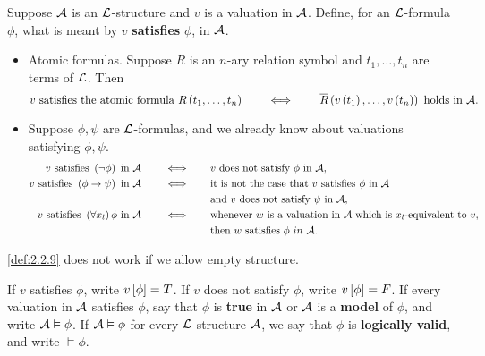 \begin{definition}
\label{def:2.2.9}
Suppose $ \AA $ is an $ \LL $-structure and $ v $ is a valuation in $ \AA $. Define, for an $ \LL $-formula $ \phi $, what is meant by $ v $ \textbf{satisfies} $ \phi $, in $ \AA $.
\begin{itemize}
\item Atomic formulas. Suppose $ R $ is an $ n $-ary relation symbol and $ t_1, \dots, t_n $ are terms of $ \LL $. Then
$$ v \ \text{satisfies the atomic formula} \ R\rb{t_1, \dots, t_n} \qquad \iff \qquad \overline{R}\rb{v\rb{t_1}, \dots, v\rb{t_n}} \ \text{holds in} \ \AA. $$
\item Suppose $ \phi, \psi $ are $ \LL $-formulas, and we already know about valuations satisfying $ \phi, \psi $.
\begin{align*}
v \ \text{satisfies} \ \notb{\phi} \ \text{in} \ \AA \qquad \iff \qquad & v \ \text{does not satisfy} \ \phi \ \text{in} \ \AA, \\
v \ \text{satisfies} \ \impb{\phi}{\psi} \ \text{in} \ \AA \qquad \iff \qquad & \text{it is not the case that} \ v \ \text{satisfies} \ \phi \ \text{in} \ \AA \\
& \text{and} \ v \ \text{does not satisfy} \ \psi \ \text{in} \ \AA, \\
v \ \text{satisfies} \ \fab{x_l}\phi \ \text{in} \ \AA \qquad \iff \qquad & \text{whenever} \ w \ \text{is a valuation in} \ \AA \ \text{which is} \ x_l \text{-equivalent to} \ v, \\
& \text{then} \ w \ \text{satisfies} \ \phi \ in \ \AA.
\end{align*}
\end{itemize}
\end{definition}


\begin{remark*}
\ref{def:2.2.9} does not work if we allow empty structure.
\end{remark*}

\begin{notation*}
If $ v $ satisfies $ \phi $, write $ v\sb{\phi} = T $. If $ v $ does not satisfy $ \phi $, write $ v\sb{\phi} = F $. If every valuation in $ \AA $ satisfies $ \phi $, say that $ \phi $ is \textbf{true} in $ \AA $ or $ \AA $ is a \textbf{model} of $ \phi $, and write $ \AA \vDash \phi $. If $ \AA \vDash \phi $ for every $ \LL $-structure $ \AA $, we say that $ \phi $ is \textbf{logically valid}, and write $ \vDash \phi $.
\end{notation*}


